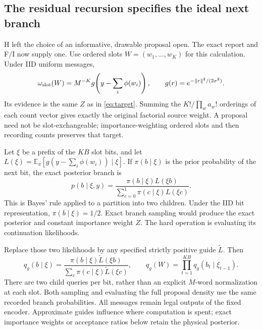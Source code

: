 \documentclass[10pt,a4paper]{article}
\newcommand{\E}{\mathbb E}
\begin{document}
\subsection{The residual recursion specifies the ideal next branch}
H left the choice of an informative, drawable proposal open. The exact report and F/I now supply one.
Use ordered slots $W=(w_1,\ldots,w_K)$ for this calculation. Under IID uniform messages,
\[
 \omega_{\rm slot}(W)=M^{-K}g\!\left(y-\sum_i\phi(w_i)\right),\qquad
 g(r)=e^{-\|r\|^2/(2\sigma^2)}.
\]
Its evidence is the same $Z$ as in \eqref{eq:target}. Summing the $K!/\prod_w a_w!$ orderings of each
count vector gives exactly the original factorial source weight. A proposal need not be slot-exchangeable;
importance-weighting ordered slots and then recording counts preserves that target.

Let $\xi$ be a prefix of the $KB$ slot bits, and let
$L(\xi)=\E_\pi[g(y-\sum_i\phi(w_i))\mid\xi]$.
If $\pi(b\mid\xi)$ is the prior probability of the next bit, the exact posterior branch is
\begin{equation}
 p(b\mid\xi,y)=
 \frac{\pi(b\mid\xi)L(\xi b)}{\sum_{c=0}^1\pi(c\mid\xi)L(\xi c)}.
 \label{eq:ideal-bit-proposal}
\end{equation}
This is Bayes' rule applied to a partition into two children. Under the IID bit representation,
$\pi(b\mid\xi)=1/2$. Exact branch sampling would produce the exact posterior and constant importance
weight $Z$. The hard operation is evaluating its continuation likelihoods.

Replace those two likelihoods by any specified strictly positive guide $\widetilde L$. Then
\[
 q_g(b\mid\xi)=\frac{\pi(b\mid\xi)\widetilde L(\xi b)}
                         {\sum_c\pi(c\mid\xi)\widetilde L(\xi c)},\qquad
 q_g(W)=\prod_{t=1}^{KB}q_g(b_t\mid\xi_{t-1}).
\]
There are two child queries per bit, rather than an explicit $M$-word normalization at each slot.
Both sampling and evaluating the full proposal density use the same recorded branch probabilities.
All messages remain legal outputs of the fixed encoder. Approximate guides influence where computation
is spent; exact importance weights or acceptance ratios below retain the physical posterior.
\end{document}
